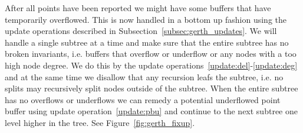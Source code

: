 \documentclass[twoside,11pt,openright]{report}
\begin{document}
After all points have been reported we might have some buffers that have temporarily overflowed. This is now handled in a bottom up fashion using the update operations described in Subsection~\ref{subsec:gerth_updates}. We will handle a single subtree at a time and make sure that the entire subtree has no broken invariants, i.e. buffers that overflow or underflow or any nodes with a too high node degree. We do this by the update operations~\ref{update:del}-\ref{update:deg} and at the same time we disallow that any recursion leafs the subtree, i.e. no splits may recursively split nodes outside of the subtree. When the entire subtree has no overflows or underflows we can remedy a potential underflowed point buffer using update operation~\ref{update:pbu} and continue to the next subtree one level higher in the tree. See Figure~\ref{fig:gerth_fixup}.

\end{document}
